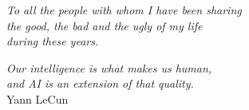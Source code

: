 \thispagestyle{empty}
\null {}
        \begin{flushright}
        \emph{To all the people with whom I have been sharing \\ the good, the bad and the ugly of my life \\ during these years.}
        \end{flushright}
\null
%
\newpage
%
\thispagestyle{empty}
\null {}
        \begin{flushright}
        \emph{Our intelligence is what makes us human,\\ and AI is an extension of that quality.} \\%
        Yann LeCun
        \end{flushright}
\null